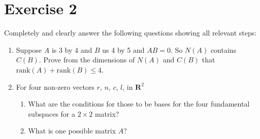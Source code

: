 \section{Exercise 2}
Completely and clearly answer the following questions showing all relevant
steps:
\begin{enumerate}[label=(\alph*)]
    \item Suppose $A$ is 3 by 4 and $B$ us 4 by 5 and $AB=0$. So $N(A)$
        contains $C(B)$. Prove from the dimensions of $N(A)$  and $C(B)$
        that $\text{rank}(A) + \text{rank}(B)\leq 4$.
        
    \item For four non-zero vectors $r$, $n$, $c$, $l$, in
        $\mathbf{R}^{2}$
        \begin{enumerate}[label=(\arabic*)]
            \item What are the conditions for those to be bases for the
                four fundamental subspaces for a $2 \times 2$ matrix? 

            \item What is one possible matrix $A$?
        \end{enumerate}


\end{enumerate}
